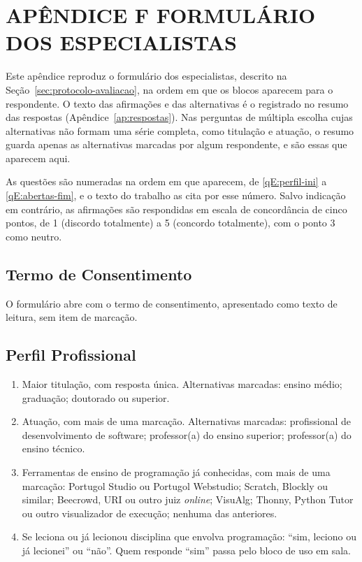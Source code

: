 \chapter[APÊNDICE F -- FORMULÁRIO DOS ESPECIALISTAS]{{\centering APÊNDICE F \textendash{} FORMULÁRIO DOS ESPECIALISTAS}}  \label{ap:formulario-especialistas}
\newenvironment{questoes}[1]{\def\qcounter{#1}\renewcommand{\theenumi}{Q\arabic{enumi}}\renewcommand{\labelenumi}{\theenumi.}\begin{enumerate}\setcounter{enumi}{\value{#1}}}{\setcounter{\qcounter}{\value{enumi}}\end{enumerate}}

Este apêndice reproduz o formulário dos especialistas, descrito na Seção~\ref{sec:protocolo-avaliacao}, na ordem em que os blocos aparecem para o respondente. O texto das afirmações e das alternativas é o registrado no resumo das respostas (Apêndice~\ref{ap:respostas}). Nas perguntas de múltipla escolha cujas alternativas não formam uma série completa, como titulação e atuação, o resumo guarda apenas as alternativas marcadas por algum respondente, e são essas que aparecem aqui.

As questões são numeradas na ordem em que aparecem, de \ref{qE:perfil-ini} a \ref{qE:abertas-fim}, e o texto do trabalho as cita por esse número. Salvo indicação em contrário, as afirmações são respondidas em escala de concordância de cinco pontos, de 1 (discordo totalmente) a 5 (concordo totalmente), com o ponto 3 como neutro.

\section{Termo de Consentimento}

O formulário abre com o termo de consentimento, apresentado como texto de leitura, sem item de marcação.

\section{Perfil Profissional}

\begin{questoes}{qE}
    \item\label{qE:perfil-ini} Maior titulação, com resposta única. Alternativas marcadas: ensino médio; graduação; doutorado ou superior.
    \item Atuação, com mais de uma marcação. Alternativas marcadas: profissional de desenvolvimento de software; professor(a) do ensino superior; professor(a) do ensino técnico.
    \item Ferramentas de ensino de programação já conhecidas, com mais de uma marcação: Portugol Studio ou Portugol Webstudio; Scratch, Blockly ou similar; Beecrowd, URI ou outro juiz \textit{online}; VisuAlg; Thonny, Python Tutor ou outro visualizador de execução; nenhuma das anteriores.
    \item\label{qE:perfil-fim} Se leciona ou já lecionou disciplina que envolva programação: ``sim, leciono ou já lecionei'' ou ``não''. Quem responde ``sim'' passa pelo bloco de uso em sala.
\end{questoes}

